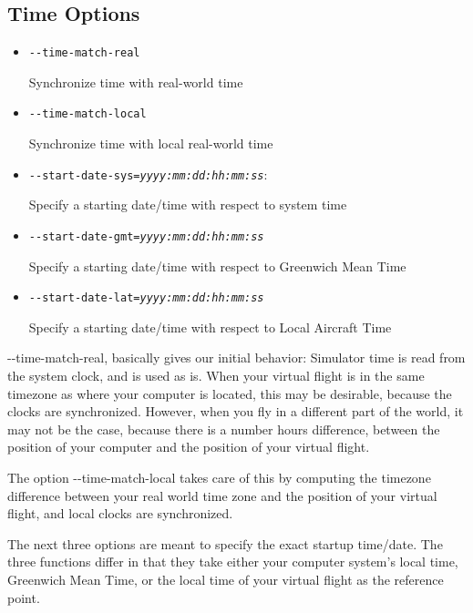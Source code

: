 \subsection{Time Options}
\begin{itemize}
\item{\texttt{-$ $-time-match-real}}

  Synchronize time with real-world time

\item{\texttt{-$ $-time-match-local}}

  Synchronize time with local real-world time

\item{\texttt{-$ $-start-date-sys={\it yyyy:mm:dd:hh:mm:ss}}}:

  Specify a starting date/time with respect to system time

\item{\texttt{-$ $-start-date-gmt={\it yyyy:mm:dd:hh:mm:ss}}}

  Specify a starting date/time with respect to Greenwich Mean Time

\item{\texttt{-$ $-start-date-lat={\it yyyy:mm:dd:hh:mm:ss}}}

  Specify a starting date/time with respect to Local Aircraft Time
\end{itemize}

{-$ $-time-match-real}, basically gives our initial behavior: Simulator time is
read from the system clock, and is used as is. When your virtual flight is in
the same timezone as where your computer is located, this may be desirable,
because the clocks are synchronized. However, when you fly in a different
part of the world, it may not be the case, because there is a number hours
difference, between the position of your computer and the position of your
virtual flight.

The option {-$ $-time-match-local} takes care of this by computing the timezone
difference between your real world time zone and the position of your virtual
flight, and local clocks are synchronized.

The next three options are meant to specify the exact startup time/date. The
three functions differ in that they take either your computer system's local
time, Greenwich Mean Time, or the local time of your virtual flight as the
reference point.


